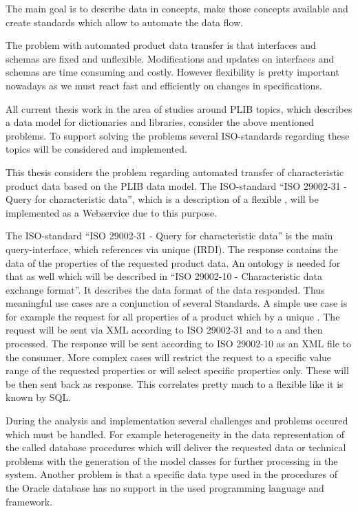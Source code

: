 The main goal is to describe data in concepts, make those concepts available and create standards which allow to automate the data flow.  

The problem with automated product data transfer is that interfaces and schemas are fixed and unflexible. Modifications and updates on interfaces and schemas are time consuming and costly. However flexibility is pretty important nowadays as we must react fast and efficiently on changes in specifications. 
 
All current thesis work in the area of studies around \gls{PLIB} topics, which describes a data model for dictionaries and libraries, consider the above mentioned problems. To support solving the problems several ISO-standards regarding these topics will be considered and implemented. 

This thesis considers the problem regarding automated transfer of characteristic product data based on the \gls{PLIB} data model. The ISO-standard \enquote{ISO 29002-31 - Query for characteristic data}, which is a description of a flexible , will be implemented as a Webservice due to this purpose. 

The ISO-standard \enquote{ISO 29002-31 - Query for characteristic data} is the main query-interface, which references  via unique  (IRDI).
The response contains the data of the properties of the requested product data. An ontology is needed for that as well which will be described in \enquote{ISO 29002-10 - Characteristic data exchange format}. It describes the data format of the data responded. Thus meaningful use cases are a conjunction of several Standards. 
A simple use case is for example the request for all properties of a product which by a unique . The request will be sent via XML according to ISO 29002-31 and to a  and then processed. The response will be sent according to ISO 29002-10 as an XML file to the consumer. More complex cases will restrict the request to a specific value range of the requested properties or will select specific properties only. These will be then sent back as response. This  correlates pretty much to a flexible  like it is known by SQL. 

During the analysis and implementation several challenges and problems occured which must be handled. For example heterogeneity in the data representation of the called database procedures which will deliver the requested data or technical problems with the generation of the model classes for further processing in the system. Another problem is that a specific data type used in the procedures of the Oracle database has no support in the used programming language and framework.  
 
